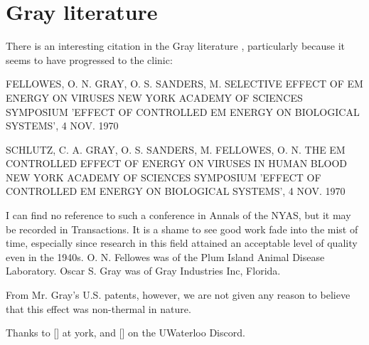\documentclass[paper.tex]{subfiles}
\begin{document}
\section{Gray literature}

There is an interesting citation in the Gray literature \cite{Index1981}, particularly because it seems to have progressed to the clinic:

FELLOWES, O. N. GRAY, O. S. SANDERS, M. SELECTIVE EFFECT OF EM ENERGY ON VIRUSES 
NEW YORK ACADEMY OF SCIENCES SYMPOSIUM 'EFFECT OF CONTROLLED EM ENERGY ON BIOLOGICAL SYSTEMS', 4 NOV. 1970

SCHLUTZ, C. A. GRAY, O. S. SANDERS, M. FELLOWES, O. N. 
THE EM CONTROLLED EFFECT OF ENERGY ON VIRUSES IN HUMAN BLOOD NEW YORK ACADEMY OF SCIENCES SYMPOSIUM 'EFFECT OF CONTROLLED EM ENERGY ON BIOLOGICAL SYSTEMS', 4 NOV. 1970

I can find no reference to such a conference in Annals of the NYAS, but it may be recorded in Transactions. It is a shame to see good work fade into the mist of time, especially since research in this field attained an acceptable level of quality even in the 1940s. O. N. Fellowes was of the Plum Island Animal Disease Laboratory. Oscar S. Gray was of Gray Industries Inc, Florida. 

From Mr. Gray's U.S. patents, however, we are not given any reason to believe that this effect was non-thermal in nature.

Thanks to [] at york, and [] on the UWaterloo Discord.
\end{document}
